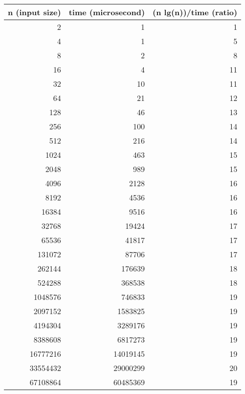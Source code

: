 \documentclass[11pt,letterpaper,oneside]{article}
\begin{document}
\begin{enumerate}
\begin{tabular}{rrr}
n (input size) & time (microsecond) & (n lg(n))/time (ratio)\\ \hline
2 & 1 & 1\\
4 & 1 & 5\\
8 & 2 & 8\\
16 & 4 & 11\\
32 & 10 & 11\\
64 & 21 & 12\\
128 & 46 & 13\\
256 & 100 & 14\\
512 & 216 & 14\\
1024 & 463 & 15\\
2048 & 989 & 15\\
4096 & 2128 & 16\\
8192 & 4536 & 16\\
16384 & 9516 & 16\\
32768 & 19424 & 17\\
65536 & 41817 & 17\\
131072 & 87706 & 17\\
262144 & 176639 & 18\\
524288 & 368538 & 18\\
1048576 & 746833 & 19\\
2097152 & 1583825 & 19\\
4194304 & 3289176 & 19\\
8388608 & 6817273 & 19\\
16777216 & 14019145 & 19\\
33554432 & 29000299 & 20\\
67108864 & 60485369 & 19
\end{tabular}

\end{enumerate}
\end{document}
